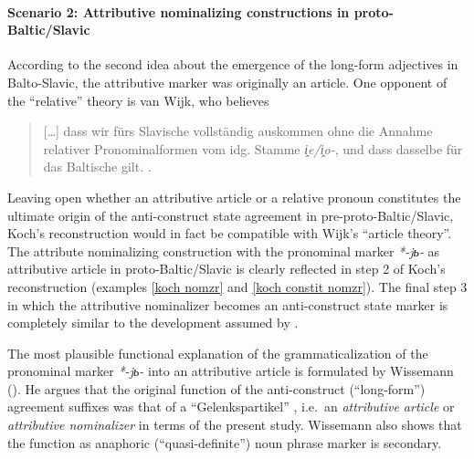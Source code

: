 
\paragraph{Scenario 2: Attributive nominalizing constructions in proto-Baltic/Slavic} 
According to the second idea about the emergence of the long-form adjectives in Balto-Slavic, the attributive marker was originally an article. One opponent of the “relative” theory is van Wijk, who believes 
\begin{quote}
[\dots] dass wir fürs Slavische vollständig auskommen ohne die Annahme relativer Pronominalformen vom idg. Stamme \textit{i̭e/i̭o-}, und dass dasselbe für das Baltische gilt. \citep[28]{wijk1935}.
\end{quote}
Leaving open whether an attributive article or a relative pronoun constitutes the ultimate origin of the anti-construct state agreement in pre-proto-Baltic/Slavic, Koch's reconstruction would in fact be compatible with Wijk's “article theory”. The attribute nominalizing construction with the pronominal marker \textit{*-jь-} as attributive article in proto-Baltic/Slavic is clearly reflected in step 2 of Koch's reconstruction (examples \ref{koch nomzr} and \ref{koch constit nomzr}). The final step 3 in which the attributive nominalizer becomes an anti-construct state marker is completely similar to the development assumed by \cite{wijk1935}.

The most plausible functional explanation of the grammaticalization of the pronominal marker \textit{*-jь-} into an attributive article is formulated by Wissemann (\citeyear{wissemann1958}). He argues that the original function of the anti-construct (“long-form”) agreement suffixes was that of a “Gelenkspartikel” \citep[76]{wissemann1958}, i.e.~an \textit{attributive article} or \textit{attributive nominalizer} in terms of the present study. Wissemann also shows that the function as anaphoric (“quasi-definite”) noun phrase marker is secondary.

